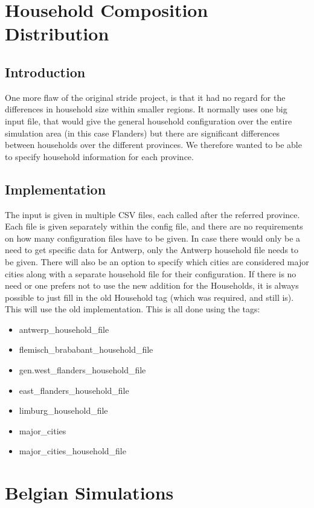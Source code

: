 \documentclass[runningheads]{llncs}
\begin{document}
	\section{Household Composition Distribution}
	\subsection{Introduction}
	One more flaw of the original stride project, is that it had no regard for the differences in household size within smaller regions. It normally uses one big input file, that would give the general household configuration over the entire simulation area (in this case Flanders) but there are significant differences between households over the different provinces. We therefore wanted to be able to specify household information for each province.
	\subsection{Implementation}
	The input is given in multiple CSV files, each called after the referred province. Each file is given separately within the config file, and there are no requirements on how many configuration files have to be given. In case there would only be a need to get specific data for Antwerp, only the Antwerp household file needs to be given. There will also be an option to specify which cities are considered major cities along with a separate household file for their configuration. If there is no need or one prefers not to use the new addition for the Households, it is always possible to just fill in the old Household tag (which was required, and still is). This will use the old implementation. This is all done using the tags:
	\begin{itemize}
		\item antwerp\_household\_file
		\item flemisch\_brababant\_household\_file
		\item gen.west\_flanders\_household\_file
		\item east\_flanders\_household\_file
		\item limburg\_household\_file
		\item major\_cities
		\item major\_cities\_household\_file
	\end{itemize}
	\section{Belgian Simulations}
	
\end{document}
